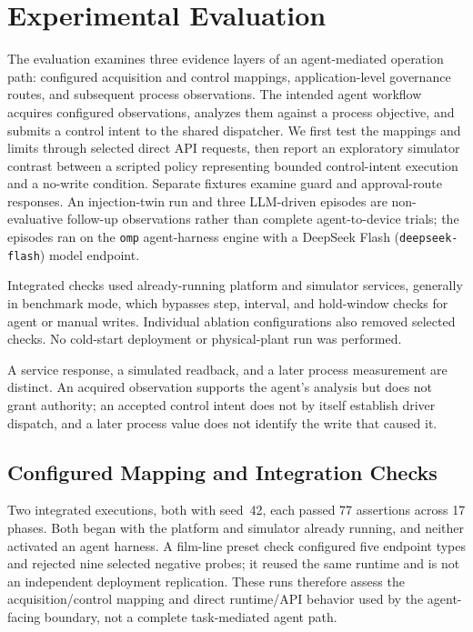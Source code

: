 \documentclass[journal]{IEEEtran}
\begin{document}
  \section{Experimental Evaluation}
\label{sec:eval}
The evaluation examines three evidence layers of an agent-mediated operation path: configured acquisition and control mappings, application-level governance routes, and subsequent process observations. The intended agent workflow acquires configured observations, analyzes them against a process objective, and submits a control intent to the shared dispatcher. We first test the mappings and limits through selected direct API requests, then report an exploratory simulator contrast between a scripted policy representing bounded control-intent execution and a no-write condition. Separate fixtures examine guard and approval-route responses. An injection-twin run and three LLM-driven episodes are non-evaluative follow-up observations rather than complete agent-to-device trials; the episodes ran on the \texttt{omp} agent-harness engine with a DeepSeek Flash (\texttt{deepseek-flash}) model endpoint.

Integrated checks used already-running platform and simulator services, generally in benchmark mode, which bypasses step, interval, and hold-window checks for agent or manual writes. Individual ablation configurations also removed selected checks. No cold-start deployment or physical-plant run was performed.

A service response, a simulated readback, and a later process measurement are distinct. An acquired observation supports the agent's analysis but does not grant authority; an accepted control intent does not by itself establish driver dispatch, and a later process value does not identify the write that caused it.

\subsection{Configured Mapping and Integration Checks}
\label{sec:eval-mapping}
Two integrated executions, both with seed~42, each passed 77 assertions across 17 phases. Both began with the platform and simulator already running, and neither activated an agent harness. A film-line preset check configured five endpoint types and rejected nine selected negative probes; it reused the same runtime and is not an independent deployment replication. These runs therefore assess the acquisition/control mapping and direct runtime/API behavior used by the agent-facing boundary, not a complete task-mediated agent path.
\end{document}
